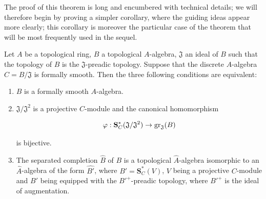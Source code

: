 The proof of this theorem is long and encumbered with technical details;
we will therefore begin by proving a simpler corollary, where the guiding ideas appear more clearly;
this corollary is moreover the particular case of the theorem  that will be most frequently used in the sequel.

\begin{corollary}[19.5.4]
\label{0.19.5.4}
Let $A$ be a topological ring, $B$ a topological $A$-algebra, $\mathfrak{J}$ an ideal of $B$ such that the topology of $B$ is the $\mathfrak{J}$-preadic topology.
Suppose that the discrete $A$-algebra $C=B/\mathfrak{J}$ is formally smooth.
Then the three following conditions are equivalent:
\begin{enumerate}
  \item[a)] $B$ is a formally smooth $A$-algebra.
  \item[b)] $\mathfrak{J}/\mathfrak{J}^2$ is a projective $C$-module and the canonical homomorphism
  
\[
\varphi:\mathbf{S}_C^*(\mathfrak{J}/\mathfrak{J}^2) \to \operatorname{gr}_\mathfrak{J}(B)
\]

  is bijective.
  \item[c)] The separated completion $\widehat{B}$ of $B$ is a topological $\widehat{A}$-algebra isomorphic to an $\widehat{A}$-algebra of the form $\widehat{B'}$, where $B'=\mathbf{S}_C^*(V)$, $V$ being a projective $C$-module and $B'$ being equipped with the ${B'}^+$-preadic topology, where ${B'}^+$ is the ideal of augmentation.
\end{enumerate}
\end{corollary}

